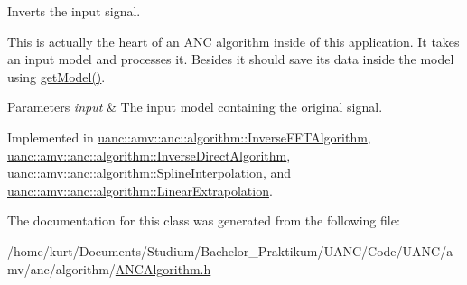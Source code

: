Inverts the input signal. 

This is actually the heart of an A\+NC algorithm inside of this application. It takes an input model and processes it. Besides it should save its data inside the model using \hyperlink{classuanc_1_1amv_1_1anc_1_1algorithm_1_1_a_n_c_algorithm_a12ce80f6746cbb440cf771fc6878f7cf}{get\+Model()}.


\begin{DoxyParams}{Parameters}
{\em input} & The input model containing the original signal. \\
\hline
\end{DoxyParams}


Implemented in \hyperlink{classuanc_1_1amv_1_1anc_1_1algorithm_1_1_inverse_f_f_t_algorithm_a75d38b5ce03bca80a856dfa257f590a4}{uanc\+::amv\+::anc\+::algorithm\+::\+Inverse\+F\+F\+T\+Algorithm}, \hyperlink{classuanc_1_1amv_1_1anc_1_1algorithm_1_1_inverse_direct_algorithm_a4bd1bdcd128aee1f608be51660528954}{uanc\+::amv\+::anc\+::algorithm\+::\+Inverse\+Direct\+Algorithm}, \hyperlink{classuanc_1_1amv_1_1anc_1_1algorithm_1_1_spline_interpolation_a60dcdd5acbba6fee64cf228485b81523}{uanc\+::amv\+::anc\+::algorithm\+::\+Spline\+Interpolation}, and \hyperlink{classuanc_1_1amv_1_1anc_1_1algorithm_1_1_linear_extrapolation_aafb6717c9cb632241b10875630970388}{uanc\+::amv\+::anc\+::algorithm\+::\+Linear\+Extrapolation}.



The documentation for this class was generated from the following file\+:\begin{DoxyCompactItemize}
\item 
/home/kurt/\+Documents/\+Studium/\+Bachelor\+\_\+\+Praktikum/\+U\+A\+N\+C/\+Code/\+U\+A\+N\+C/amv/anc/algorithm/\hyperlink{_a_n_c_algorithm_8h}{A\+N\+C\+Algorithm.\+h}\end{DoxyCompactItemize}
